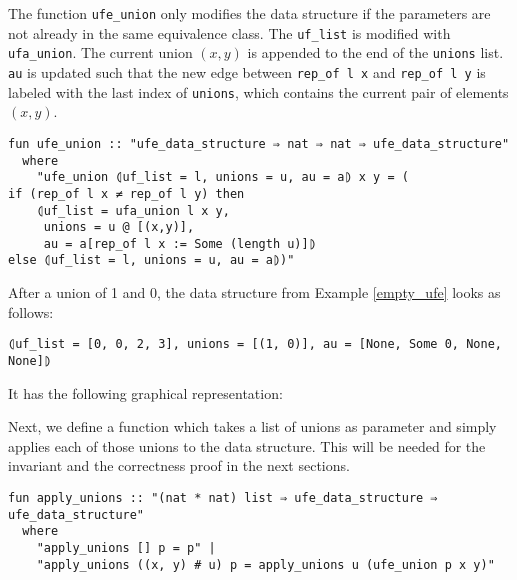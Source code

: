 The function \lstinline{ufe_union} only modifies the data structure if the parameters are not already in the same equivalence class.
The \lstinline{uf_list} is modified with \lstinline{ufa_union}.
The current union $(x, y)$ is appended to the end of the \lstinline{unions} list.
\lstinline{au} is updated such that the new edge between \lstinline{rep_of l x} and \lstinline{rep_of l y} is labeled with the last index of \lstinline{unions}, which contains the current pair of elements $(x, y)$.

\begin{lstlisting}
fun ufe_union :: "ufe_data_structure ⇒ nat ⇒ nat ⇒ ufe_data_structure"
  where
    "ufe_union ⦇uf_list = l, unions = u, au = a⦈ x y = (
if (rep_of l x ≠ rep_of l y) then
    ⦇uf_list = ufa_union l x y,
     unions = u @ [(x,y)],
     au = a[rep_of l x := Some (length u)]⦈
else ⦇uf_list = l, unions = u, au = a⦈)"
\end{lstlisting}

\begin{exmp}
After a union of 1 and 0, the data structure from Example \ref{empty_ufe} looks as follows:
\begin{lstlisting}
⦇uf_list = [0, 0, 2, 3], unions = [(1, 0)], au = [None, Some 0, None, None]⦈
\end{lstlisting}
It has the following graphical representation:
\begin{center}
\end{center}

\end{exmp}

Next, we define a function which takes a list of unions as parameter and simply applies each of those unions to the data structure. This will be needed for the invariant and the correctness proof in the next sections.

\begin{lstlisting}
fun apply_unions :: "(nat * nat) list ⇒ ufe_data_structure ⇒ ufe_data_structure"
  where
    "apply_unions [] p = p" |
    "apply_unions ((x, y) # u) p = apply_unions u (ufe_union p x y)"
\end{lstlisting}

